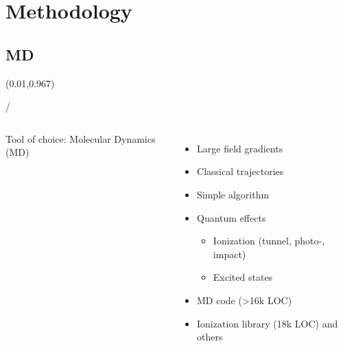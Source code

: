 \documentclass{beamer}
\makeatletter
\newcommand{\framenumber}{
\begin{textblock}{0}(0.01,0.967)
\begin{scriptsize}
{\color{gray}\insertframenumber/\inserttotalframenumber}
\end{scriptsize}
\end{textblock}
}
\makeatother
\begin{document}
\section{Methodology}

\subsection{MD}
\begin{frame}{}\framenumber
\begin{columns}
    Tool of choice: Molecular Dynamics (MD)
    \begin{itemize}
     \item Large field gradients
     \item Classical trajectories
     \item Simple algorithm
     \item Quantum effects
     \begin{itemize}
        \item Ionization (tunnel, photo-, impact)
        \item Excited states
     \end{itemize}
     \item<6-> MD code (>16k LOC)
     \item<6-> Ionization library (18k LOC) and others
    \end{itemize}
    \color{white}\color{black}

\end{columns}
\end{frame}
\end{document}
